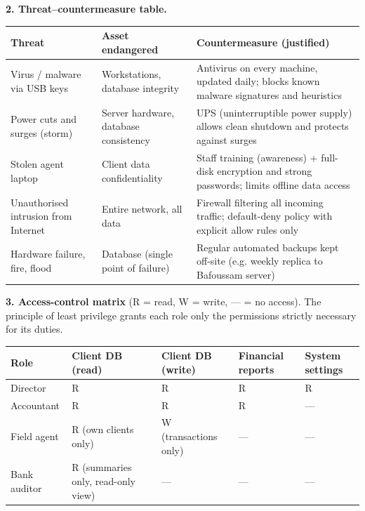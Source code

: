 \documentclass[11pt]{article}
\newcommand{\cle}[1]{{\popxbold\color{popdark}#1}}
\begin{document}
\textbf{2. Threat–countermeasure table.}

\begin{center}
\begin{tabularx}{\linewidth}{|l|X|X|}
\hline
\rowcolor{popblueL} \textbf{Threat} & \textbf{Asset endangered} & \textbf{Countermeasure (justified)} \\
\hline
Virus / malware via USB keys & Workstations, database integrity & Antivirus on every machine, updated daily; blocks known malware signatures and heuristics \\
\hline
Power cuts and surges (storm) & Server hardware, database consistency & UPS (uninterruptible power supply) allows clean shutdown and protects against surges \\
\hline
Stolen agent laptop & Client data confidentiality & Staff training (awareness) + full-disk encryption and strong passwords; limits offline data access \\
\hline
Unauthorised intrusion from Internet & Entire network, all data & Firewall filtering all incoming traffic; default-deny policy with explicit allow rules only \\
\hline
Hardware failure, fire, flood & Database (single point of failure) & Regular automated backups kept off-site (e.g. weekly replica to Bafoussam server) \\
\hline
\end{tabularx}
\end{center}

\textbf{3. Access-control matrix} (R = read, W = write, — = no access). The principle of \cle{least privilege} grants each role only the permissions strictly necessary for its duties.

\begin{center}
\begin{tabularx}{\linewidth}{|l|X|X|X|X|}
\hline
\rowcolor{popblueL} \textbf{Role} & \textbf{Client DB (read)} & \textbf{Client DB (write)} & \textbf{Financial reports} & \textbf{System settings} \\
\hline
Director & R & R & R & R \\
\hline
Accountant & R & R & R & — \\
\hline
Field agent & R (own clients only) & W (transactions only) & — & — \\
\hline
Bank auditor & R (summaries only, read-only view) & — & — & — \\
\hline
\end{tabularx}
\end{center}
\end{document}
